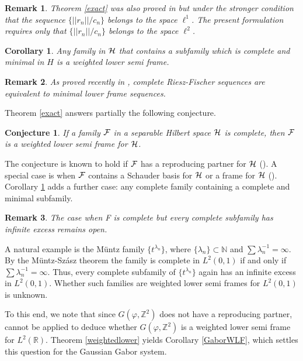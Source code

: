 \documentclass[11pt, a4paper]{article}
\newtheorem{corollary}{Corollary}[section]
\newtheorem{remark}{Remark}[section]
\newtheorem{conjecture}{Conjecture}[section]
\begin{document}
\begin{remark}
Theorem \ref{exact} was also proved in \cite[Theorem 1.3]{Zikkos2025ACHA}
but under the stronger condition that the sequence $\{||r_n||/c_n\}$ belongs to the space $\ell^1$. 
The present formulation requires only that $\{||r_n||/c_n\}$ belongs to the space $\ell^2$.
\end{remark}

\begin{corollary}\label{subexact}
Any family in $\cal H$ that contains a subfamily which is complete and minimal in $H$ is a weighted lower semi frame.
\end{corollary}

\begin{remark}
As proved recently in \cite{BalazsShamsabadi}, complete Riesz-Fischer sequences are equivalent to minimal lower frame sequences.
\end{remark}

 
Theorem \ref{exact} answers partially the following conjecture.

\begin{conjecture}\cite[Conjecture 3.1]{Balazs2026JFAA}
If a family $\cal{F}$ in a separable Hilbert space $\cal{H}$ is complete, then $\cal{F}$ is a weighted lower semi frame
for $\cal{H}$.
\end{conjecture}

The conjecture is known to hold if $\cal{F}$  has a reproducing partner for $\cal{H}$ (\cite[Proposition 3.3]{Balazs2026JFAA}).
A special case is when $\cal{F}$ contains a Schauder basis for $\cal{H}$ or a frame for $\cal{H}$
(\cite[Corollary 3.5]{Balazs2026JFAA}). Corollary \ref{subexact} adds a further
case: any complete family containing a complete and minimal subfamily.

\begin{remark}
The case when F is complete but every complete subfamily has infinite
excess remains open.
\end{remark}
A natural example is the M\"{u}ntz family $\{t^{\lambda_n}\}$, where $\{\lambda_n\}\subset\mathbb{N}$ and $\sum \lambda_n^{-1}=\infty$.  
By the M\"{u}ntz-Sz\'{a}sz theorem the family is complete in $L^2 (0,1)$ if and only if $\sum \lambda_n^{-1}=\infty$.
Thus, every complete subfamily of $\{t^{\lambda_n}\}$ again has an infinite excess in $L^2(0,1)$. Whether such families are weighted lower semi frames for $L^2 (0,1)$ is unknown. 


To this end, we note that since $G(\varphi, \mathbb{Z}^2)$ does not have a reproducing partner,
\cite[Proposition 3.3]{Balazs2026JFAA} cannot be applied to deduce whether $G(\varphi, \mathbb{Z}^2)$
is a weighted lower semi frame for $L^2 (\mathbb{R})$.
Theorem \ref{weightedlower} yields Corollary \ref{GaborWLF}, which settles this question for the Gaussian Gabor system.
\end{document}
